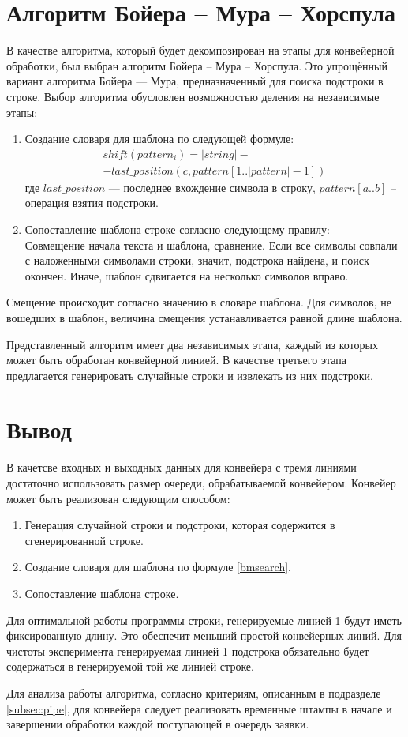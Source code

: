 \section{Алгоритм Бойера -- Мура -- Хорспула}
В качестве алгоритма, который будет декомпозирован на этапы для конвейерной обработки, был выбран алгоритм Бойера -- Мура -- Хорспула. Это упрощённый вариант алгоритма Бойера — Мура\cite{bmserach}, предназначенный для поиска подстроки в строке. 
Выбор алгоритма обусловлен возможностью деления на независимые этапы: 
\begin{enumerate}
	\item Создание словаря для шаблона по следующей формуле: 
	\begin{equation}\label{bmsearch}
 		\begin{array}{ll}
 			shift(pattern_i) = |string| - \\
 			- last\_position(c, pattern[1..|pattern| - 1])
 		\end{array}
	\end{equation}
	где $last\_position$ — последнее вхождение символа в строку, $pattern[a..b]$ -- операция взятия подстроки.
	\item Сопоставление шаблона строке согласно следующему правилу: \\ 
	Совмещение начала текста и шаблона, сравнение. Если все символы совпали с наложенными символами строки, значит, подстрока найдена, и поиск окончен. Иначе, шаблон сдвигается на несколько символов вправо.
\end{enumerate}
Смещение происходит согласно значению в словаре шаблона. Для символов, не вошедших в шаблон, величина смещения устанавливается равной длине шаблона.

Представленный алгоритм имеет два независимых этапа, каждый из которых может быть обработан конвейерной линией. В качестве третьего этапа предлагается генерировать случайные строки и извлекать из них подстроки.

\section{Вывод}\label{sec:analyth-summ}
В качетсве входных и выходных данных для конвейера с тремя линиями достаточно использовать размер очереди, обрабатываемой конвейером. Конвейер может быть реализован следующим способом:
\begin{enumerate}[label=Линия \arabic*., leftmargin=*]
	\setlength{\itemsep}{1pt}
	\item Генерация случайной строки и подстроки, которая содержится в сгенерированной строке.
	\item Создание словаря для шаблона по формуле \ref{bmsearch}.
	\item Сопоставление шаблона строке.
\end{enumerate}
Для оптимальной работы программы строки, генерируемые линией 1 будут иметь фиксированную длину. Это обеспечит меньший простой конвейерных линий. 
Для чистоты эксперимента генерируемая линией 1 подстрока обязательно будет содержаться в генерируемой той же линией строке.

Для анализа работы алгоритма, согласно критериям, описанным  в подразделе \ref{subsec:pipe},  для конвейера следует реализовать временные штампы в начале и завершении обработки каждой поступающей в очередь заявки.


